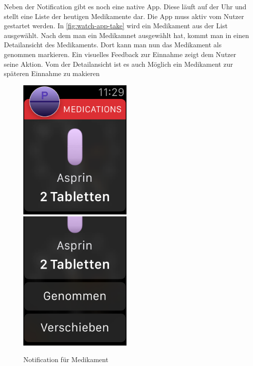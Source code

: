 Neben der Notification gibt es noch eine  native App. Diese läuft auf der Uhr und stellt eine Liste der heutigen Medikamente dar. Die App muss aktiv vom Nutzer gestartet werden. In \ref{fig:watch-app-take} wird ein Medikament aus der List ausgewählt. Nach dem man ein Medikamnet ausgewählt hat, kommt man in einen Detailansicht des Medikaments. Dort kann man nun das Medikament als genommen markieren. Ein visuelles Feedback zur Einnahme zeigt dem Nutzer seine Aktion. Vom der Detailansicht ist es auch Möglich ein Medikament zur späteren Einnahme zu makieren 

\begin{figure}
	\caption{Notification für Medikament}
	\label{fig:watch-app-notification}
	\includegraphics[width=0.5\textwidth]{04_realisation/screenshots/watch/notification01.png}
	\includegraphics[width=0.5\textwidth]{04_realisation/screenshots/watch/notification02.png}
\end{figure}

